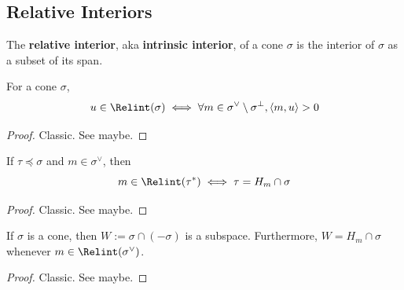 \subsection{Relative Interiors}


\begin{definition}
  \label{1-2-rel-interior}
  \leanok

  The {\bf relative interior}, aka {\bf intrinsic interior}, of a cone $\sigma$ is the interior of $\sigma$ as a subset of its span.
\end{definition}


\begin{lemma}
  \label{1-2-rel-interior-inner}

  For a cone $\sigma$,
  $$u \in \Relint(\sigma) \iff \forall m \in \sigma^\vee \setminus \sigma^\perp, \langle m, u\rangle > 0$$
\end{lemma}
\begin{proof}

  Classic. See \cite{Oda_1988} maybe.
\end{proof}


\begin{lemma}
  \label{1-2-rel-interior-dual-face}

  If $\tau \preceq \sigma$ and $m \in \sigma^\vee$, then
  $$m \in \Relint(\tau^*) \iff \tau = H_m \cap \sigma$$
\end{lemma}
\begin{proof}

  Classic. See \cite{Oda_1988} maybe.
\end{proof}


\begin{lemma}
  \label{1-2-min-face}

  If $\sigma$ is a cone, then $W := \sigma \cap (-\sigma)$ is a subspace. Furthermore,
  $W = H_m \cap \sigma$ whenever $m \in \Relint(\sigma^\vee)$.
\end{lemma}
\begin{proof}

  Classic. See \cite{Oda_1988} maybe.
\end{proof}


